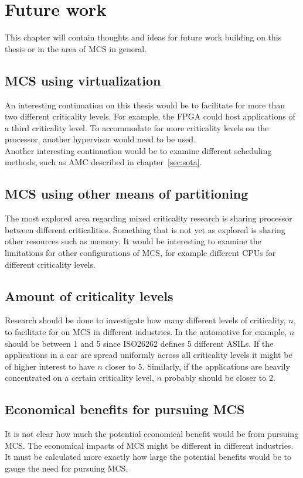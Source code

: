 \chapter{Future work}
\label{sec:future_work}
This chapter will contain thoughts and ideas for future work building on this thesis or in the area of MCS in general.

\section{MCS using virtualization}
An interesting continuation on this thesis would be to facilitate for more than two different criticality levels. For example, the FPGA could host applications of a third criticality level. To accommodate for more criticality levels on the processor, another hypervisor would need to be used.\\

Another interesting continuation would be to examine different scheduling methods, such as AMC described in chapter~\ref{sec:sota}.

\section{MCS using other means of partitioning}
The most explored area regarding mixed criticality research is sharing processor between different criticalities. Something that is not yet as explored is sharing other resources such as memory. It would be interesting to examine the limitations for other configurations of MCS, for example different CPUs for different criticality levels.

\section{Amount of criticality levels}
Research should be done to investigate how many different levels of criticality, $n$, to facilitate for on MCS in different industries. In the automotive for example, $n$ should be between 1 and 5 since ISO26262 defines 5 different ASILs. If the applications in a car are spread uniformly across all criticality levels it might be of higher interest to have $n$ closer to 5. Similarly, if the applications are heavily concentrated on a certain criticality level, $n$ probably should be closer to 2.

\section{Economical benefits for pursuing MCS}
It is not clear how much the potential economical benefit would be from pursuing MCS. The economical impacts of MCS might be different in different industries. It must be calculated more exactly how large the potential benefits would be to gauge the need for pursuing MCS.

